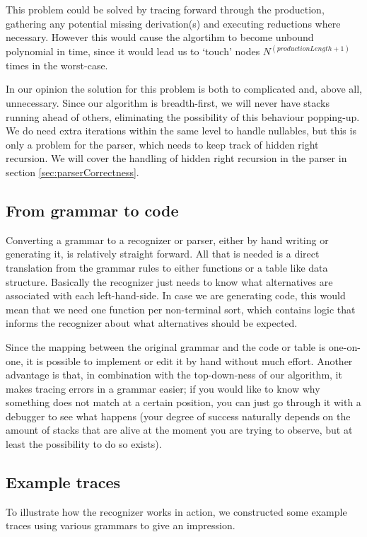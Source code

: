 \documentclass[a4paper,10pt]{article}
\begin{document}
This problem could be solved by tracing forward through the production, gathering any potential missing derivation(s) and executing reductions where necessary. However this would cause the algortihm to become unbound polynomial in time, since it would lead us to `touch' nodes $N^{(productionLength+1)}$ times in the worst-case.

In our opinion the solution for this problem is both to complicated and, above all, unnecessary. Since our algorithm is breadth-first, we will never have stacks running ahead of others, eliminating the possibility of this behaviour popping-up. We do need extra iterations within the same level to handle nullables, but this is only a problem for the parser, which needs to keep track of hidden right recursion. We will cover the handling of hidden right recursion in the parser in section \ref{sec:parserCorrectness}.

\subsection{From grammar to code}

Converting a grammar to a recognizer or parser, either by hand writing or generating it, is relatively straight forward. All that is needed is a direct translation from the grammar rules to either functions or a table like data structure. Basically the recognizer just needs to know what alternatives are associated with each left-hand-side. In case we are generating code, this would mean that we need one function per non-terminal sort, which contains logic that informs the recognizer about what alternatives should be expected.

Since the mapping between the original grammar and the code or table is one-on-one, it is possible to implement or edit it by hand without much effort. Another advantage is that, in combination with the top-down-ness of our algorithm, it makes tracing errors in a grammar easier; if you would like to know why something does not match at a certain position, you can just go through it with a debugger to see what happens (your degree of success naturally depends on the amount of stacks that are alive at the moment you are trying to observe, but at least the possibility to do so exists).

\subsection{Example traces}

To illustrate how the recognizer works in action, we constructed some example traces using various grammars to give an impression.
\end{document}
